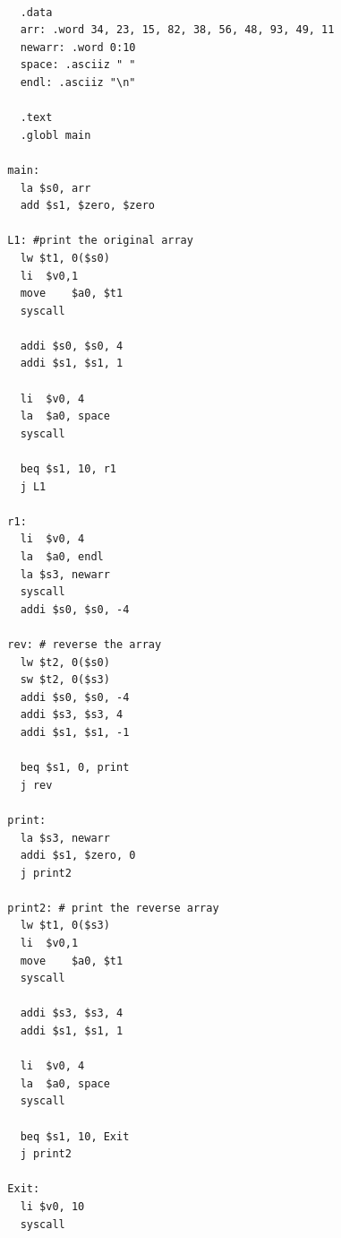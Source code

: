 \documentclass[12pt,a4paper]{article}
\begin{document}
\begin{mdframed}[hidealllines=true,backgroundcolor=magenta!10]
  \begin{lstlisting}

    .data
    arr: .word 34, 23, 15, 82, 38, 56, 48, 93, 49, 11
    newarr: .word 0:10
    space: .asciiz " "
    endl: .asciiz "\n"

    .text
    .globl main

  main:
    la $s0, arr
    add $s1, $zero, $zero

  L1: #print the original array
    lw $t1, 0($s0)
    li	$v0,1
    move	$a0, $t1
    syscall

    addi $s0, $s0, 4
    addi $s1, $s1, 1

    li	$v0, 4
    la	$a0, space
    syscall

    beq $s1, 10, r1
    j L1

  r1:
    li	$v0, 4
    la	$a0, endl
    la $s3, newarr
    syscall
    addi $s0, $s0, -4

  rev: # reverse the array
    lw $t2, 0($s0)
    sw $t2, 0($s3)
    addi $s0, $s0, -4
    addi $s3, $s3, 4
    addi $s1, $s1, -1

    beq $s1, 0, print
    j rev

  print:
    la $s3, newarr
    addi $s1, $zero, 0
    j print2

  print2: # print the reverse array
    lw $t1, 0($s3)
    li	$v0,1
    move	$a0, $t1
    syscall

    addi $s3, $s3, 4
    addi $s1, $s1, 1

    li	$v0, 4
    la	$a0, space
    syscall

    beq $s1, 10, Exit
    j print2

  Exit:
    li $v0, 10
    syscall

    \end{lstlisting}
\end{mdframed}
\end{document}
